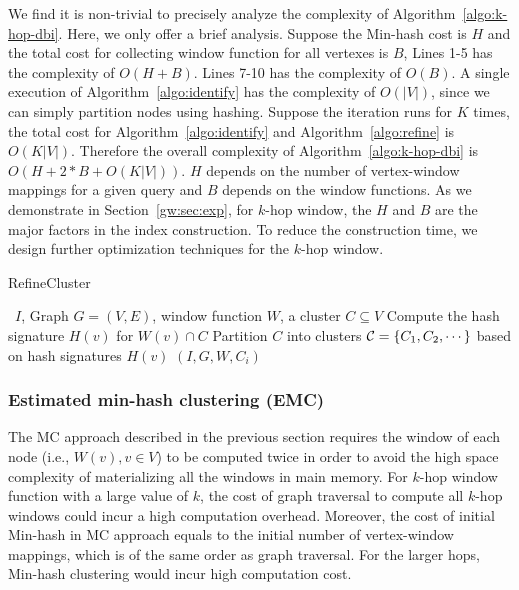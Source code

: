 We find it is non-trivial to precisely analyze the complexity of Algorithm~\ref{algo:k-hop-dbi}.
Here, we only offer a brief analysis. Suppose the Min-hash cost is $H$ and 
the total cost for collecting window function for all vertexes is $B$, 
Lines 1-5 has the complexity of $O(H + B)$.  
Lines 7-10 has the complexity of $O(B)$. A single execution of Algorithm~\ref{algo:identify}  has the  complexity of $O(|V|)$, since we can simply partition nodes using hashing. Suppose the iteration runs for $K$ times, the total cost for Algorithm~\ref{algo:identify} and Algorithm~\ref{algo:refine} is $O(K|V|)$. Therefore the overall complexity of Algorithm~\ref{algo:k-hop-dbi} is $O(H+2*B + O(K|V|))$. $H$ depends on the number of vertex-window mappings for a given query and $B$ depends on the window functions.
As we demonstrate in Section~\ref{gw:sec:exp}, for $k$-hop window, the $H$ and $B$ are the major factors in the index construction. To reduce the construction time, we design further optimization techniques for the $k$-hop window.


\begin{algorithm}
\caption{RefineCluster}
\begin{algorithmic}[1]
\Require \DBIndex\ $I$, Graph $G=(V,E)$, window function $W$, a cluster $C \subseteq V$
{}
	\State Compute the hash signature $H(v)$ for $W(v) \cap C$
\EndFor
\State Partition $C$ into clusters ${\cal C} = \{C_1,C_2,\cdots\}$ based on hash signatures $H(v)$
	 $(I,G,W,C_i)$
\EndFor
\end{algorithmic}
\label{algo:refine}
\end{algorithm}

\subsubsection{Estimated min-hash clustering (EMC)}
\label{sec:optimized}

The MC approach described in the previous section requires the window of each node (i.e., $W(v), v \in V$)
to be computed twice in order to avoid the high space complexity of materializing all the windows in main memory.
For $k$-hop window function with a large value of $k$, the cost of graph traversal 
to compute all $k$-hop windows
could incur a high computation overhead. Moreover, the cost of initial Min-hash in MC approach equals to the initial number of vertex-window mappings, which is of the same order as graph traversal. For the larger hops, Min-hash clustering would incur high computation cost.

